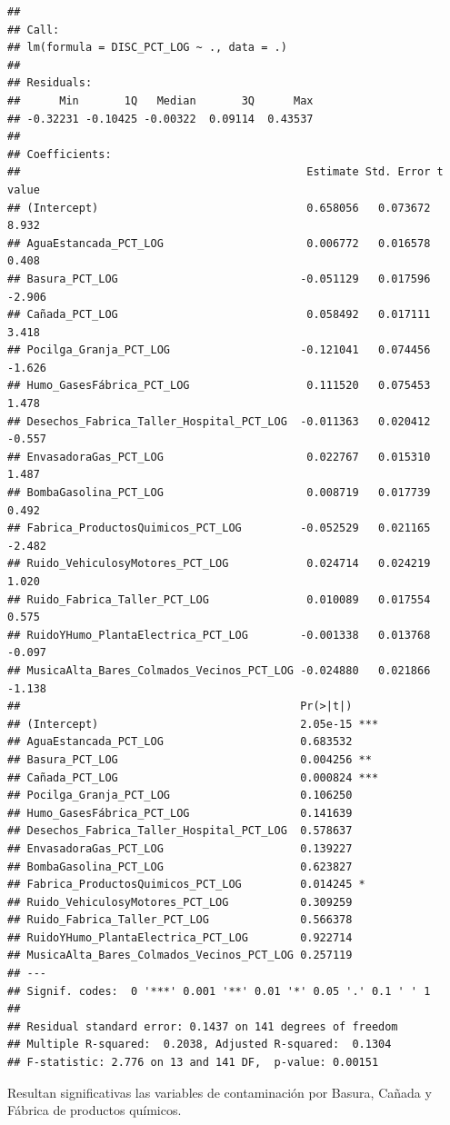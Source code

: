 \documentclass[11pt,]{article}
\begin{document}
\begin{verbatim}
## 
## Call:
## lm(formula = DISC_PCT_LOG ~ ., data = .)
## 
## Residuals:
##      Min       1Q   Median       3Q      Max 
## -0.32231 -0.10425 -0.00322  0.09114  0.43537 
## 
## Coefficients:
##                                            Estimate Std. Error t value
## (Intercept)                                0.658056   0.073672   8.932
## AguaEstancada_PCT_LOG                      0.006772   0.016578   0.408
## Basura_PCT_LOG                            -0.051129   0.017596  -2.906
## Cañada_PCT_LOG                             0.058492   0.017111   3.418
## Pocilga_Granja_PCT_LOG                    -0.121041   0.074456  -1.626
## Humo_GasesFábrica_PCT_LOG                  0.111520   0.075453   1.478
## Desechos_Fabrica_Taller_Hospital_PCT_LOG  -0.011363   0.020412  -0.557
## EnvasadoraGas_PCT_LOG                      0.022767   0.015310   1.487
## BombaGasolina_PCT_LOG                      0.008719   0.017739   0.492
## Fabrica_ProductosQuimicos_PCT_LOG         -0.052529   0.021165  -2.482
## Ruido_VehiculosyMotores_PCT_LOG            0.024714   0.024219   1.020
## Ruido_Fabrica_Taller_PCT_LOG               0.010089   0.017554   0.575
## RuidoYHumo_PlantaElectrica_PCT_LOG        -0.001338   0.013768  -0.097
## MusicaAlta_Bares_Colmados_Vecinos_PCT_LOG -0.024880   0.021866  -1.138
##                                           Pr(>|t|)    
## (Intercept)                               2.05e-15 ***
## AguaEstancada_PCT_LOG                     0.683532    
## Basura_PCT_LOG                            0.004256 ** 
## Cañada_PCT_LOG                            0.000824 ***
## Pocilga_Granja_PCT_LOG                    0.106250    
## Humo_GasesFábrica_PCT_LOG                 0.141639    
## Desechos_Fabrica_Taller_Hospital_PCT_LOG  0.578637    
## EnvasadoraGas_PCT_LOG                     0.139227    
## BombaGasolina_PCT_LOG                     0.623827    
## Fabrica_ProductosQuimicos_PCT_LOG         0.014245 *  
## Ruido_VehiculosyMotores_PCT_LOG           0.309259    
## Ruido_Fabrica_Taller_PCT_LOG              0.566378    
## RuidoYHumo_PlantaElectrica_PCT_LOG        0.922714    
## MusicaAlta_Bares_Colmados_Vecinos_PCT_LOG 0.257119    
## ---
## Signif. codes:  0 '***' 0.001 '**' 0.01 '*' 0.05 '.' 0.1 ' ' 1
## 
## Residual standard error: 0.1437 on 141 degrees of freedom
## Multiple R-squared:  0.2038, Adjusted R-squared:  0.1304 
## F-statistic: 2.776 on 13 and 141 DF,  p-value: 0.00151
\end{verbatim}

Resultan significativas las variables de contaminación por Basura,
Cañada y Fábrica de productos químicos.
\end{document}
